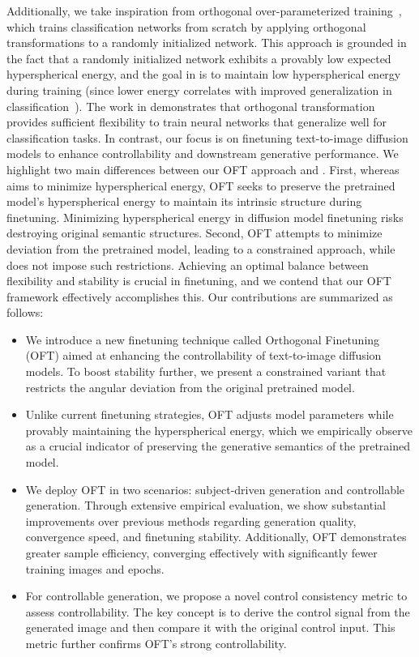 Additionally, we take inspiration from orthogonal over-parameterized training~\cite{liu2021orthogonal}, which trains classification networks from scratch by applying orthogonal transformations to a randomly initialized network. This approach is grounded in the fact that a randomly initialized network exhibits a provably low expected hyperspherical energy, and the goal in \cite{liu2021orthogonal} is to maintain low hyperspherical energy during training (since lower energy correlates with improved generalization in classification~\cite{liu2018learning,lin2020regularizing}). The work in \cite{liu2021orthogonal} demonstrates that orthogonal transformation provides sufficient flexibility to train neural networks that generalize well for classification tasks. In contrast, our focus is on finetuning text-to-image diffusion models to enhance controllability and downstream generative performance. We highlight two main differences between our OFT approach and \cite{liu2021orthogonal}. First, whereas \cite{liu2021orthogonal} aims to minimize hyperspherical energy, OFT seeks to preserve the pretrained model’s hyperspherical energy to maintain its intrinsic structure during finetuning. Minimizing hyperspherical energy in diffusion model finetuning risks destroying original semantic structures. Second, OFT attempts to minimize deviation from the pretrained model, leading to a constrained approach, while \cite{liu2021orthogonal} does not impose such restrictions. Achieving an optimal balance between flexibility and stability is crucial in finetuning, and we contend that our OFT framework effectively accomplishes this. Our contributions are summarized as follows:

\begin{itemize}[leftmargin=*,nosep]

    \item We introduce a new finetuning technique called Orthogonal Finetuning (OFT) aimed at enhancing the controllability of text-to-image diffusion models. To boost stability further, we present a constrained variant that restricts the angular deviation from the original pretrained model.
    \item Unlike current finetuning strategies, OFT adjusts model parameters while provably maintaining the hyperspherical energy, which we empirically observe as a crucial indicator of preserving the generative semantics of the pretrained model.
    \item We deploy OFT in two scenarios: subject-driven generation and controllable generation. Through extensive empirical evaluation, we show substantial improvements over previous methods regarding generation quality, convergence speed, and finetuning stability. Additionally, OFT demonstrates greater sample efficiency, converging effectively with significantly fewer training images and epochs.
    \item For controllable generation, we propose a novel control consistency metric to assess controllability. The key concept is to derive the control signal from the generated image and then compare it with the original control input. This metric further confirms OFT’s strong controllability.
\end{itemize}

